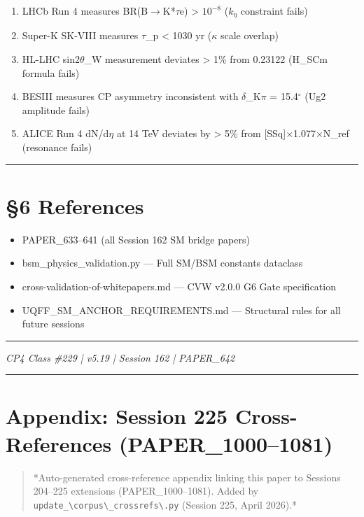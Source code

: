 \documentclass[12pt,a4paper]{article}
\begin{document}
\begin{enumerate}
  \item LHCb Run 4 measures BR(B$\to$K*$\tau$e) > $10^{-8}$ ($k_{\eta}$ constraint fails)
  \item Super-K SK-VIII measures $\tau$\_p < 1030 yr ($\kappa$ scale overlap)
  \item HL-LHC sin2$\theta$\_W measurement deviates > 1\% from 0.23122 (H\_SCm formula fails)
  \item BESIII measures CP asymmetry inconsistent with $\delta$\_K$\pi$ = 15.4$^{\circ}$ (Ug2 amplitude fails)
  \item ALICE Run 4 dN/d$\eta$ at 14 TeV deviates by > 5\% from [SSq]$\times$1.077$\times$N\_ref (resonance fails)
\end{enumerate}

\medskip\hrule\medskip

\section{\S{}6 References}

\begin{itemize}
  \item PAPER\_633--641 (all Session 162 SM bridge papers)
  \item bsm\_{physics\_validation}.py --- Full SM/BSM constants dataclass
  \item cross-validation-of-whitepapers.md --- CVW v2.0.0 G6 Gate specification
  \item UQFF\_{SM\_ANCHOR\_REQUIREMENTS}.md --- Structural rules for all future sessions
\end{itemize}

\medskip\hrule\medskip

\emph{CP4 Class \#229 | v5.19 | Session 162 | PAPER\_642}

\medskip\hrule\medskip

\section{Appendix: Session 225 Cross-References (PAPER\_1000--1081)}

\begin{quote}
*Auto-generated cross-reference appendix linking this paper to
Sessions 204--225 extensions (PAPER\_1000--1081). Added by
\texttt{update\_\textbackslash {corpus\textbackslash \_crossrefs\textbackslash }.py} (Session 225, April 2026).*
\end{quote}
\end{document}
